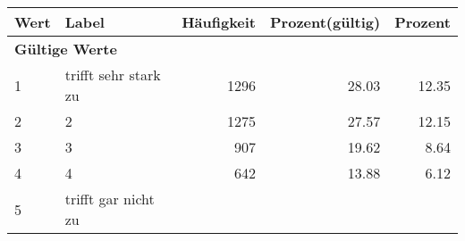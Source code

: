      \begin{longtable}{lXrrr}
     \toprule
     \textbf{Wert} & \textbf{Label} & \textbf{Häufigkeit} & \textbf{Prozent(gültig)} & \textbf{Prozent} \\
     \endhead
     \midrule
     \multicolumn{5}{l}{\textbf{Gültige Werte}}\\

     1 &
     \multicolumn{1}{X}{ trifft sehr stark zu   } &


       \num{1296} &
       \num[round-mode=places,round-precision=2]{28,03} &
         \num[round-mode=places,round-precision=2]{12,35} \\

     2 &
     \multicolumn{1}{X}{ 2   } &


       \num{1275} &
       \num[round-mode=places,round-precision=2]{27,57} &
         \num[round-mode=places,round-precision=2]{12,15} \\

     3 &
     \multicolumn{1}{X}{ 3   } &


       \num{907} &
       \num[round-mode=places,round-precision=2]{19,62} &
         \num[round-mode=places,round-precision=2]{8,64} \\

     4 &
     \multicolumn{1}{X}{ 4   } &


       \num{642} &
       \num[round-mode=places,round-precision=2]{13,88} &
         \num[round-mode=places,round-precision=2]{6,12} \\

     5 &
     \multicolumn{1}{X}{ trifft gar nicht zu   } &



\end{longtable}
